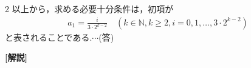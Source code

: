 \documentclass[../../../../main.tex]{subfiles}
\begin{document}
\begin{multicols}{2}
  以上から，求める必要十分条件は，初項が
  \begin{align*}
    a_1 = \frac{i}{3 \cdot 2^{k-2}} \quad (k \in \mathbb{N}, k \ge 2, i=0,1,\dots,3 \cdot 2^{k-2})
  \end{align*}
  と表されることである.$\cdots$(答)

  \vspace{10pt}
  {\bf[解説]}



  \newpage
\end{multicols}
\end{document}

